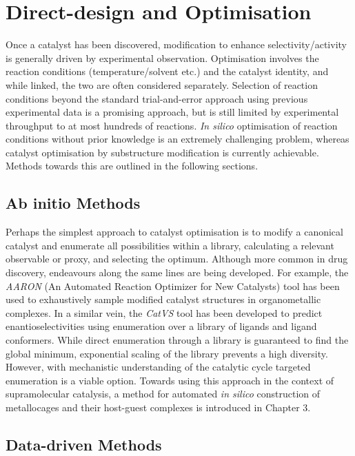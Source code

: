 \documentclass[../main.tex]{subfiles}
\begin{document}
\section{Direct-design and Optimisation}

Once a catalyst has been discovered, modification to enhance selectivity/activity is generally driven by experimental observation. Optimisation involves the reaction conditions (temperature/solvent etc.) and the catalyst identity, and while linked, the two are often considered separately. Selection of reaction conditions beyond the standard trial-and-error approach using previous experimental data is a promising approach,\cite{hase2021gryffin, Shields2021} but is still limited by experimental throughput to at most hundreds of reactions.\cite{Koinuma2004, Mennen2019} \emph{In silico} optimisation of reaction conditions without prior knowledge is an extremely challenging problem, whereas catalyst optimisation by substructure modification is currently achievable. Methods towards this are outlined in the following sections.

\subsection{Ab initio Methods}

Perhaps the simplest approach to catalyst optimisation is to modify a canonical catalyst and enumerate all possibilities within a library, calculating a relevant observable or proxy, and selecting the optimum. Although more common in drug discovery,\cite{Kitchen2004} endeavours along the same lines are being developed. For example, the \emph{AARON} (An Automated Reaction Optimizer for New Catalysts) tool has been used to exhaustively sample modified catalyst structures in organometallic complexes.\cite{Guan2018} In a similar vein, the \emph{CatVS} tool has been developed to predict enantioselectivities using enumeration over a library of ligands and ligand conformers.\cite{Rosales2018} While direct enumeration through a library is guaranteed to find the global minimum, exponential scaling of the library prevents a high diversity. However, with mechanistic understanding of the catalytic cycle targeted enumeration is a viable option. Towards using this approach in the context of supramolecular catalysis, a method for automated \emph{in silico} construction of metallocages and their host-guest complexes is introduced in Chapter 3. 

\subsection{Data-driven Methods}
\end{document}
